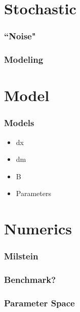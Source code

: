 



\section{Stochastic}

\begin{frame}
    \frametitle{``Noise"}
\end{frame}

\begin{frame}
    \frametitle{Modeling}
\end{frame}






\section{Model}

\begin{frame}
    \frametitle{Models}
	\begin{itemize}
		\item dx
		\item dm
		\item B
		\item Parameters
	\end{itemize}
\end{frame}





\section{Numerics}

\begin{frame}
    \frametitle{Milstein}
\end{frame}

\begin{frame}
    \frametitle{Benchmark?}
\end{frame}

\begin{frame}
    \frametitle{Parameter Space}
\end{frame}



